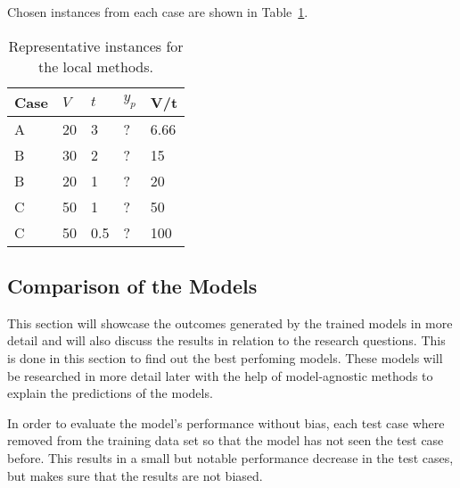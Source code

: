 Chosen instances from each case are shown in Table~\ref{tab:representative-instances}.

\begin{table}[H]
    \begin{tcolorbox}[arc=0pt,boxrule=0.5pt]
        \centering
        \begin{tabular}{lllll}
            \toprule
            \textbf{Case} & \textbf{\(V\) } & \textbf{\(t\)} & \textbf{\(y_p\)} & \textbf{V/t} \\
            \toprule
            A             & 20              & 3              & ?                & 6.66         \\
            \hdashline
            \hdashline
            B             & 30              & 2              & ?                & 15           \\
            B             & 20              & 1              & ?                & 20           \\
            \hdashline
            C             & 50              & 1              & ?                & 50           \\
            C             & 50              & 0.5            & ?                & 100          \\
            \bottomrule
        \end{tabular}
    \end{tcolorbox}
    \caption{Representative instances for the local methods.}
    \label{tab:representative-instances}
\end{table}

\subsection{Comparison of the Models}\label{subsec:overall-comparison-model-performance}
This section will showcase the outcomes generated by the trained models in more detail and
will also discuss the results in relation to the research questions.
This is done in this section to find out the best perfoming models.
These models will be researched in more detail later with the help of model-agnostic
methods to explain the predictions of the models.

In order to evaluate the model's performance without bias, each test case where removed
from the training data set so that the model has not seen the test case before.
This results in a small but notable performance decrease in the test cases, but makes sure that the
results are not biased.

